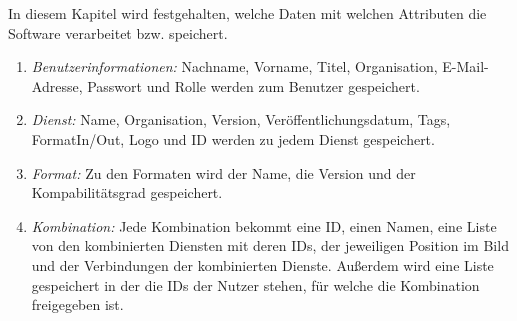 In diesem Kapitel wird festgehalten, welche Daten mit welchen Attributen die Software verarbeitet bzw. speichert.
\begin{enumerate}
	\item \textit{Benutzerinformationen:}
	Nachname, Vorname, Titel, Organisation, E-Mail-Adresse, Passwort und Rolle werden zum Benutzer gespeichert.
	\item \textit{Dienst:} Name, Organisation, Version, Veröffentlichungsdatum, Tags, FormatIn/Out, Logo und ID werden zu
	jedem Dienst gespeichert.
	\item \textit{Format:} Zu den Formaten wird der Name, die Version und der Kompabilitätsgrad gespeichert.
	\item \textit{Kombination:} Jede Kombination bekommt eine ID, einen Namen, eine Liste von den kombinierten Diensten mit deren IDs, der jeweiligen Position im Bild und der Verbindungen der kombinierten Dienste.
	Außerdem wird eine Liste gespeichert in der die IDs der Nutzer stehen, für welche die Kombination freigegeben ist.
\end{enumerate}
